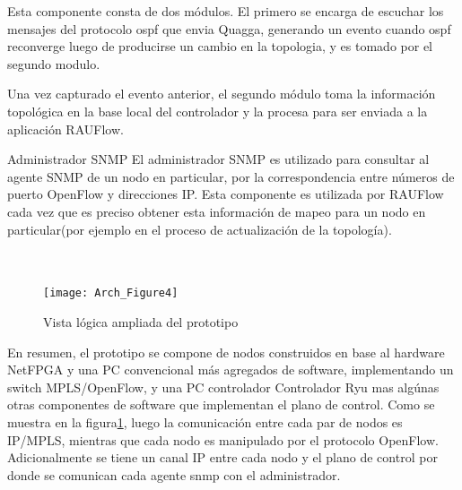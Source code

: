 Esta componente consta de dos módulos. El primero se encarga de escuchar los mensajes del protocolo ospf que envia Quagga, generando un evento cuando ospf reconverge luego de producirse un cambio en la topologia, y es tomado por el segundo modulo.

Una vez capturado el evento anterior, el segundo m\'odulo toma la información topol\'ogica en la base local del controlador y la procesa para ser enviada a la aplicación RAUFlow.

\begin{subsection}{Administrador SNMP}
El administrador SNMP es utilizado para consultar al agente SNMP de un nodo en particular, por la correspondencia entre números de puerto OpenFlow y direcciones IP. Esta componente es utilizada por RAUFlow cada vez que es preciso obtener esta información de mapeo para un nodo en particular(por ejemplo en el proceso de actualización de la topolog\'ia).\\\\\

\end{subsection}

\begin{figure}[htbp!] 
\centering    
\texttt{[image: Arch\_Figure4]}
\caption[Vista l\'ogica ampliada del prototipo]{Vista l\'ogica ampliada del prototipo}
\label{fig:OpenSourceRArch4}
\end{figure}

En resumen, el prototipo se compone de nodos construidos en base al hardware NetFPGA y una PC convencional m\'as agregados de software, implementando un switch MPLS/OpenFlow, y una PC controlador Controlador Ryu mas alg\'unas otras componentes de software que implementan el plano de control. Como se muestra en la figura\ref{fig:OpenSourceRArch4}, luego la comunicación entre cada par de nodos es IP/MPLS, mientras que cada nodo es manipulado por el protocolo OpenFlow. Adicionalmente se tiene un canal IP entre cada nodo y el plano de control por donde se comunican cada agente snmp con el administrador.\\

